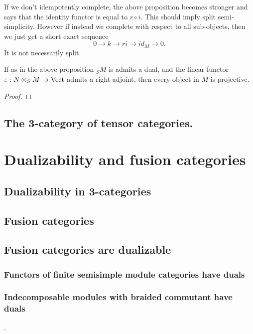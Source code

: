 \documentclass{amsart}
\begin{document}
{\color{CSPcolor} If we don't idempotently complete, the above proposition becomes stronger and says that the identity functor is equal to $r \circ i$. This should imply split semi-simplicity. However if instead we complete with respect to all sub-objects, then we just get a short exact sequence
\begin{equation*}
	0 \to k \to ri \to id_M \to 0.
\end{equation*}
It is not necessarily split. 
 }

\begin{corollary}
	If as in the above proposition ${}_S M$ is admits a dual, and the linear functor $\varepsilon:N \otimes_S M \to \mathrm{Vect} $ admits a right-adjoint, then every object in $M$ is projective.
\end{corollary}

\begin{proof}
	
\end{proof}

\subsection{The 3-category of tensor categories.}

\section{Dualizability and fusion categories}

\subsection{Dualizability in 3-categories}

\subsection{Fusion categories}

\subsection{Fusion categories are dualizable}

\subsubsection{Functors of finite semisimple module categories have duals}

\subsubsection{Indecomposable modules with braided commutant have duals} .\\
\end{document}
